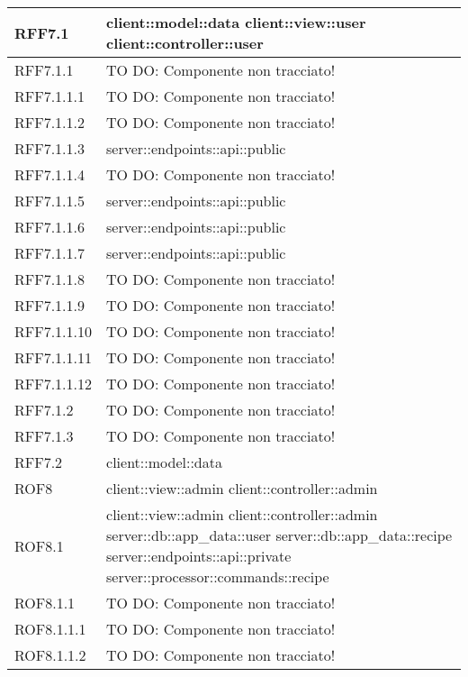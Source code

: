 \begin{center}
\begin{longtable}{| p{4cm} | p{8cm} |}
\hline
RFF7.1 & client::model::data \newline client::view::user \newline client::controller::user \\
\hline
RFF7.1.1 & TO DO: Componente non tracciato! \\
\hline
RFF7.1.1.1 & TO DO: Componente non tracciato! \\
\hline
RFF7.1.1.2 & TO DO: Componente non tracciato! \\
\hline
RFF7.1.1.3 & server::endpoints::api::public \\
\hline
RFF7.1.1.4 & TO DO: Componente non tracciato! \\
\hline
RFF7.1.1.5 & server::endpoints::api::public \\
\hline
RFF7.1.1.6 & server::endpoints::api::public \\
\hline
RFF7.1.1.7 & server::endpoints::api::public \\
\hline
RFF7.1.1.8 & TO DO: Componente non tracciato! \\
\hline
RFF7.1.1.9 & TO DO: Componente non tracciato! \\
\hline
RFF7.1.1.10 & TO DO: Componente non tracciato! \\
\hline
RFF7.1.1.11 & TO DO: Componente non tracciato! \\
\hline
RFF7.1.1.12 & TO DO: Componente non tracciato! \\
\hline
RFF7.1.2 & TO DO: Componente non tracciato! \\
\hline
RFF7.1.3 & TO DO: Componente non tracciato! \\
\hline
RFF7.2 & client::model::data \\
\hline
ROF8 & client::view::admin \newline client::controller::admin \\
\hline
ROF8.1 & client::view::admin \newline client::controller::admin \newline server::db::app\_data::user \newline server::db::app\_data::recipe \newline server::endpoints::api::private \newline server::processor::commands::recipe \\
\hline
ROF8.1.1 & TO DO: Componente non tracciato! \\
\hline
ROF8.1.1.1 & TO DO: Componente non tracciato! \\
\hline
ROF8.1.1.2 & TO DO: Componente non tracciato! \\

\end{longtable}
\end{center}
